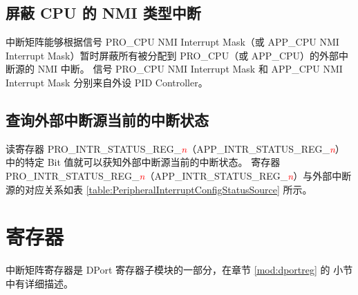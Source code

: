 \documentclass[main\_\_CN.tex]{subfiles}
\begin{document}
\subsection{屏蔽 CPU 的 NMI 类型中断}

中断矩阵能够根据信号 PRO\_CPU NMI Interrupt Mask（或 APP\_CPU NMI Interrupt Mask）暂时屏蔽所有被分配到 PRO\_CPU（或 APP\_CPU）的外部中断源的 NMI 中断。
信号 PRO\_CPU NMI Interrupt Mask 和 APP\_CPU NMI Interrupt Mask 分别来自外设 PID Controller。


\subsection{查询外部中断源当前的中断状态}

读寄存器 PRO\_INTR\_STATUS\_REG\_\textcolor{red}{\it{n}}（APP\_INTR\_STATUS\_REG\_\textcolor{red}{\it{n}}）中的特定 Bit 值就可以获知外部中断源当前的中断状态。
寄存器 PRO\_INTR\_STATUS\_REG\_\textcolor{red}{\it{n}}（APP\_INTR\_STATUS\_REG\_\textcolor{red}{\it{n}}）与外部中断源的对应关系如表 \ref{table:PeripheralInterruptConfigStatusSource} 所示。

\section{寄存器}

中断矩阵寄存器是 DPort 寄存器子模块的一部分，在章节 \ref{mod:dportreg} \textit{} 的 \textit{} 小节中有详细描述。
\end{document}
